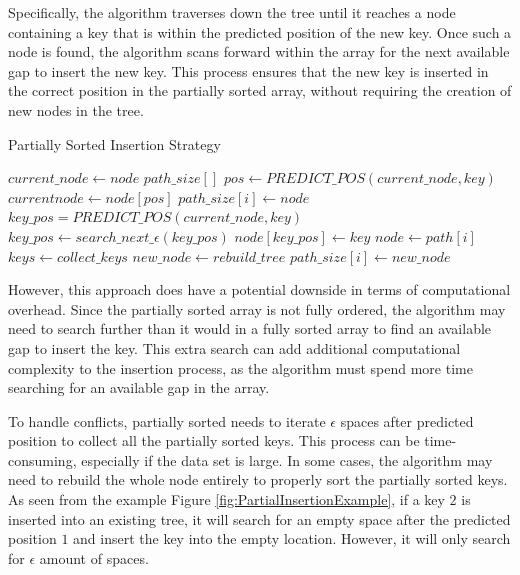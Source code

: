Specifically, the algorithm traverses down the tree until it reaches a node containing a key that is within the predicted position of the new key. Once such a node is found, the algorithm scans forward within the array for the next available gap to insert the new key. This process ensures that the new key is inserted in the correct position in the partially sorted array, without requiring the creation of new nodes in the tree.
\begin{algorithm}
\caption{Partially Sorted Insertion Strategy}
\begin{algorithmic}[1]

\State $current\_node \gets node$
\State $path\_size[]$
\State $pos \gets PREDICT\_POS(current\_node, key)$
    \State $current node \gets node[pos]$
    \State $path\_size[i] \gets node$
\Else
    \State $key\_pos = PREDICT\_POS(current\_node, key)$
        \State $key\_pos \gets search\_next\_\epsilon(key\_pos)$
    \EndIf
    $node[key\_pos] \gets key $
\EndIf
\EndWhile
{}
   \State $node \gets path[i]$
        \State $keys \gets collect\_keys$
        \State $new\_node \gets rebuild\_tree$
        \State $path\_size[i] \gets new\_node$
    \EndIf
\EndFor

\EndProcedure
\end{algorithmic}
\end{algorithm}
However, this approach does have a potential downside in terms of computational overhead. Since the partially sorted array is not fully ordered, the algorithm may need to search further than it would in a fully sorted array to find an available gap to insert the key. This extra search can add additional computational complexity to the insertion process, as the algorithm must spend more time searching for an available gap in the array.

To handle conflicts, partially sorted \learnindex needs to iterate $\epsilon$ spaces after predicted position to collect all the partially sorted keys. This process can be time-consuming, especially if the data set is large. In some cases, the algorithm may need to rebuild the whole node entirely to properly sort the partially sorted keys. As seen from the example Figure \ref{fig:PartialInsertionExample}, if a key $2$ is inserted into an existing tree, it will search for an empty space after the predicted position $1$ and insert the key into the empty location. However, it will only search for $\epsilon$ amount of spaces.

